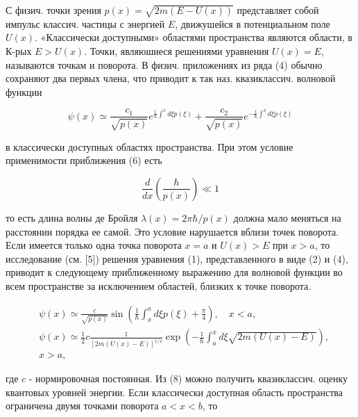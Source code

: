 \documentclass[10pt]{article}
\begin{document}
С физич. точки зрения $p(x)=\sqrt{2 m(E-U(x))}$ представляет собой импульс классич. частицы с энергией $E$, движушейся в потенциальном поле $U(x)$. «Классически доступными» областями пространства являются области, в К-рых $E>U(x)$. Точки, являюшиеся решениями уравнения $U(x)=E$, называются точкам и поворота. В физич. приложениях из ряда (4) обычно сохраняют два первых члена, что приводит к так наз. квазиклассич. волновой функции



\[

\psi(x) \simeq \frac{c_{1}}{\sqrt{p(x)}} e^{\frac{i}{\hbar} \int^{x} d \xi p(\xi)}+\frac{c_{2}}{\sqrt{p(x)}} e^{-\frac{i}{\hbar} \int^{x} d \xi p(\xi)}

\]



в классически доступных областях пространства. При этом условие применимости приближения (6) есть



\[

\frac{d}{d x}\left(\frac{\hbar}{p(x)}\right) \ll 1

\]



то есть длина волны де Бройля $\lambda(x)=2 \pi \hbar / p(x)$ должна мало меняться на расстоянии порядка ее самой. Это условие нарушается вблизи точек поворота. Если имеется только одна точка поворота $x=a$ и $U(x)>E$ при $x>a$, то исследование (см. [5]) решения уравнения (1), представленного в виде (2) и (4), приводит к следующему приближенному выражению для волновой функции во всем пространстве за исключением областей, близких к точке поворота.



\[

\begin{aligned}

& \psi(x) \simeq \frac{c}{\sqrt{p(x)}} \sin \left(\frac{1}{\hbar} \int_{x}^{a} d \xi p(\xi)+\frac{\pi}{4}\right), \quad x<a, \\

& \psi(x) \simeq \frac{1}{2} c \frac{1}{[2 m(U(x)-E)]^{1 / 4}} \exp \left(-\frac{1}{\hbar} \int_{a}^{x} d \xi \sqrt{2 m(U(x)-E)}\right), \\

& x>a,

\end{aligned}

\]



где $c$ - нормировочная постоянная. Из (8) можно получить квазиклассич. оценку квантовых уровней энергии. Если классически доступная область пространства ограничена двумя точками поворота $a<x<b$, то
\end{document}
